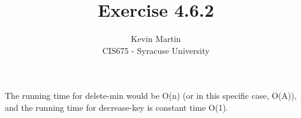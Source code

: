\documentclass{article}
\author{Kevin Martin\\ CIS675 - Syracuse University}
\title{Exercise 4.6.2}
\begin{document}
\maketitle
The running time for delete-min would be O(n) (or in this
specific case, O(A)), and the running time for decrease-key
is constant time O(1).
\end{document}
